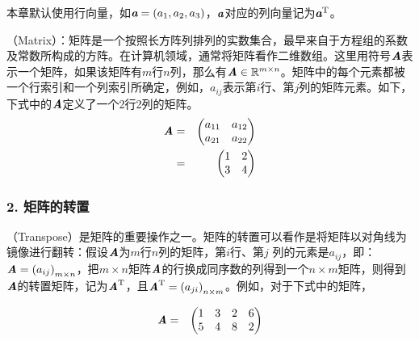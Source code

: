 \parinterval 本章默认使用行向量，如$ \textbf{\em a}=(a_1, a_2, a_3) $，$ \textbf{\em a} $对应的列向量记为$ \textbf{\em a}^{\textrm T} $。

（Matrix）：矩阵是一个按照长方阵列排列的实数集合，最早来自于方程组的系数及常数所构成的方阵。在计算机领域，通常将矩阵看作二维数组。这里用符号$ \textbf{\em A}$表示一个矩阵，如果该矩阵有$ m $行$ n $列，那么有$\textbf{\em A}\in {\mathbb R}^{m\times n} $。矩阵中的每个元素都被一个行索引和一个列索引所确定，例如，$ a_{ij} $表示第$ i $行、第$ j $列的矩阵元素。如下，下式中的$ \textbf{\em A} $定义了一个2行2列的矩阵。
\begin{eqnarray}
\textbf{\em A}& = & \begin{pmatrix}
   a_{11} & a_{12}\\
   a_{21} & a_{22}
\end{pmatrix} \nonumber \\
& = & \begin{pmatrix}
   1 & 2\\
   3 & 4
\end{pmatrix}
\label{eq:9-3}
\end{eqnarray}


\subsubsection{2. 矩阵的转置}

（Transpose）是矩阵的重要操作之一。矩阵的转置可以看作是将矩阵以对角线为镜像进行翻转：假设$\textbf{\em A}$为$ m $行$ n $列的矩阵，第$ i $行、第$ j $ 列的元素是$ a_{ij} $，即：$\textbf{\em A}={(a_{ij})}_{m\times n} $，把$ m\times n $矩阵$\textbf{\em A}$的行换成同序数的列得到一个$ n\times m $矩阵，则得到$ \textbf{\em A}$的转置矩阵，记为${\textbf{\em A}}^{\textrm T} $，且${\textbf{\em A}}^{\textrm T}={(a_{ji})}_{n\times m} $。例如，对于下式中的矩阵，

\begin{eqnarray}
\textbf{\em A} & = & \begin{pmatrix} 1 & 3 & 2 & 6\\5 & 4 & 8 & 2\end{pmatrix}
\label{eq:9-100}
\end{eqnarray}

